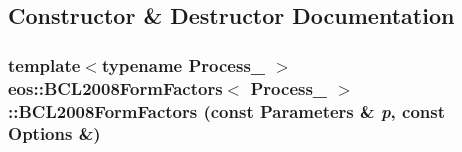\subsection{Constructor \& Destructor Documentation}
\hypertarget{classeos_1_1BCL2008FormFactors_af715bd6b136c48edf8f31d7902158ec6}{
\subsubsection[{BCL2008FormFactors}]{\setlength{\rightskip}{0pt plus 5cm}template$<$typename Process\_\- $>$ {\bf eos::BCL2008FormFactors}$<$ Process\_\- $>$::{\bf BCL2008FormFactors} (const {\bf Parameters} \& {\em p}, \/  const {\bf Options} \&)}}
\label{classeos_1_1BCL2008FormFactors_af715bd6b136c48edf8f31d7902158ec6}


